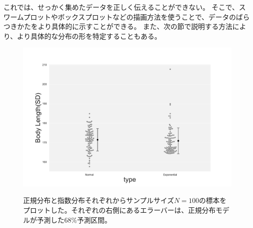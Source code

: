 
これでは、せっかく集めたデータを正しく伝えることができない。
そこで、スワームプロットやボックスプロットなどの描画方法を使うことで、データのばらつきかたをより具体的に示すことができる。
また、次の節で説明する方法により、より具体的な分布の形を特定することもある。



\begin{figure}
 \begin{center}
  \includegraphics[width=15cm]{./image/12_/sample_norm_expon.pdf}
  \label{fig:sample_norm_expon_model}
  \caption{正規分布と指数分布それぞれからサンプルサイズ$N=100$の標本をプロットした。それぞれの右側にあるエラーバーは、正規分布モデルが予測した$68\%$予測区間。}
 \end{center}
\end{figure}


